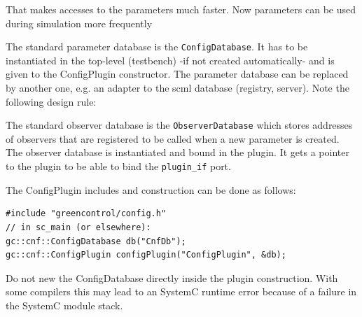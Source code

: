 
That makes accesses to the parameters much faster. Now parameters can be used during simulation more frequently

The \GreenConfig standard parameter database is the
\lstinline|ConfigDatabase|. It has to be instantiated in the top-level
(testbench) -if not created automatically- and is given to the ConfigPlugin constructor. The
parameter database can be replaced by another one, e.g. an adapter to
the scml database (registry, server). Note the following design rule:


The standard observer database is the \lstinline|ObserverDatabase| which stores addresses of observers that are registered to be called when a new parameter is created. The observer database is instantiated and bound in the plugin. It gets a pointer to the plugin to be able to bind the \lstinline|plugin_if| port.

The ConfigPlugin includes and construction can be done as follows:

\noindent
\begin{minipage}{\textwidth}
\begin{lstlisting}
#include "greencontrol/config.h"
// in sc_main (or elsewhere):
gc::cnf::ConfigDatabase db("CnfDb");
gc::cnf::ConfigPlugin configPlugin("ConfigPlugin", &db);
\end{lstlisting}
\end{minipage}

 Do not new the ConfigDatabase directly inside the plugin construction. With some compilers this may lead to an SystemC runtime error because of a failure in the SystemC module stack.

